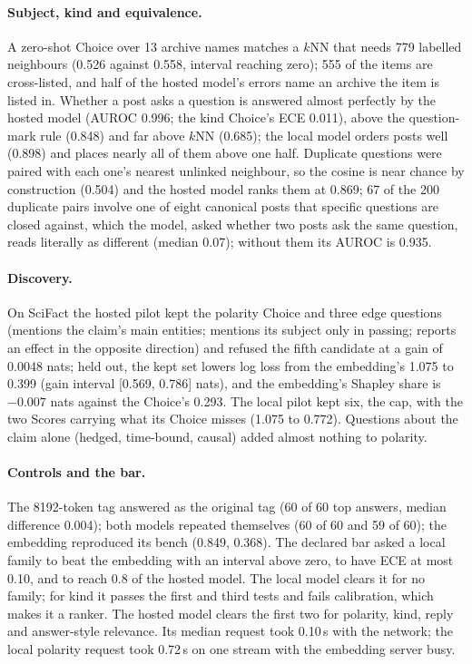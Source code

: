 \documentclass[11pt]{article}
\theoremstyle{definition}
\theoremstyle{plain}
\theoremstyle{remark}
\begin{document}
\paragraph{Subject, kind and equivalence.} A zero-shot Choice over 13 archive names matches a $k$NN
that needs 779 labelled neighbours (0.526 against 0.558, interval reaching zero); 555 of the items
are cross-listed, and half of the hosted model's errors name an archive the item is listed in.
Whether a post asks a question is answered almost perfectly by the hosted model (AUROC 0.996; the
kind Choice's ECE 0.011), above the question-mark rule (0.848) and far above $k$NN (0.685); the
local model orders posts well (0.898) and places nearly all of them above one half. Duplicate
questions were paired with each one's nearest unlinked neighbour, so the cosine is near chance by
construction (0.504) and the hosted model ranks them at 0.869; 67 of the 200 duplicate pairs
involve one of eight canonical posts that specific questions are closed against, which the model,
asked whether two posts ask the same question, reads literally as different (median 0.07); without
them its AUROC is 0.935.

\paragraph{Discovery.} On SciFact the hosted pilot kept the polarity Choice and three edge questions
(mentions the claim's main entities; mentions its subject only in passing; reports an effect in the
opposite direction) and refused the fifth candidate at a gain of 0.0048 nats; held out, the kept set
lowers log loss from the embedding's 1.075 to 0.399 (gain interval [0.569, 0.786] nats), and the
embedding's Shapley share is $-0.007$ nats against the Choice's 0.293. The local pilot kept six,
the cap, with the two Scores carrying what its Choice misses (1.075 to 0.772). Questions about the
claim alone (hedged, time-bound, causal) added almost nothing to polarity.

\paragraph{Controls and the bar.} The 8192-token tag answered as the original tag (60 of 60 top
answers, median difference 0.004); both models repeated themselves (60 of 60 and 59 of 60); the
embedding reproduced its bench (0.849, 0.368). The declared bar asked a local family to beat the
embedding with an interval above zero, to have ECE at most 0.10, and to reach 0.8 of the hosted
model. The local model clears it for no family; for kind it passes the first and third tests and
fails calibration, which makes it a ranker. The hosted model clears the first two for polarity,
kind, reply and answer-style relevance. Its median request took 0.10\,s with the network; the local
polarity request took 0.72\,s on one stream with the embedding server busy.
\end{document}
